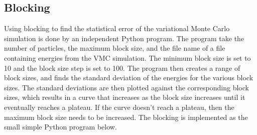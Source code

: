 \documentclass[../main.tex]{subfiles}
\begin{document}
\subsection{Blocking}
Using blocking to find the statistical error of the variational Monte Carlo simulation is done by an independent Python program. The program take the number of particles, the maximum block size, and the file name of a file containing energies from the VMC simulation. The minimum block size is set to 10 and the block size step is set to 100. The program then creates a range of block sizes, and finds the standard deviation of the energies for the various block sizes. The standard deviations are then plotted against the corresponding block sizes, which results in a curve that increases as the block size increases until it eventually reaches a plateau. If the curve doesn't reach a plateau, then the maximum block size needs to be increased. The blocking is implemented as the small simple Python program below.
\end{document}
